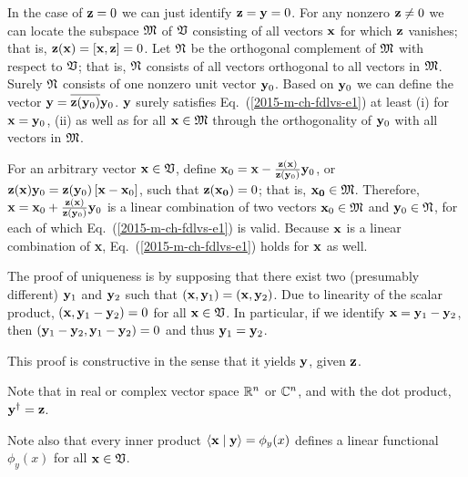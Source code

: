 {\color{OliveGreen}
\bproof
In the case of ${\bf z} =0$ we can just identify ${\bf z} ={\bf y}=0$.
For any nonzero ${\bf z} \neq 0$ we can locate the subspace ${\frak M}$ of ${\frak V}$ consisting of all vectors ${\bf x}$ for which ${\bf z}$ vanishes;
that is, ${\bf z}({\bf x})=[{\bf x},{\bf z}]=0$.
Let  ${\frak N}$ be the orthogonal complement of   ${\frak M}$ with respect to ${\frak V}$; that is,  ${\frak N}$ consists of all vectors orthogonal
to all vectors in  ${\frak M}$.
Surely ${\frak N}$ consists of one nonzero unit vector ${\bf y}_0$.
Based on ${\bf y}_0$ we can define the vector ${\bf y} = \overline{{\bf z}({\bf y}_0)} {\bf y}_0$.
${\bf y}$ surely satisfies Eq.~(\ref{2015-m-ch-fdlvs-e1}) at least
(i)
for ${\bf x} = {\bf y}_0$,
(ii)
as well as for all ${\bf x} \in {\frak M}$
through the orthogonality of ${\bf y}_0$ with all vectors in ${\frak M}$.

For an arbitrary vector ${\bf x} \in {\frak V}$, define
${\bf x}_0 =  {\bf x} -  \frac{{\bf z}({\bf x})}{{\bf z}({\bf y}_0)}  {\bf y}_0$, or
$ {\bf z}({\bf x})  {\bf y}_0 = {\bf z}({\bf y}_0) \left[{\bf x} - {\bf x}_0\right]$,
such that ${\bf z} ({\bf x_0})=0$; that is, ${\bf x_0} \in {\frak M}$.
Therefore,
${\bf x} =  {\bf x}_0 +  \frac{{\bf z}({\bf x})}{{\bf z}({\bf y}_0)}  {\bf y}_0$
is a linear combination of two vectors ${\bf x}_0 \in {\frak M}$ and ${\bf y}_0 \in {\frak N}$,
for each of which Eq.~(\ref{2015-m-ch-fdlvs-e1}) is valid.
Because ${\bf x}$ is a linear combination
of {\bf x}, Eq.~(\ref{2015-m-ch-fdlvs-e1}) holds for ${\bf x}$ as well.

The proof of uniqueness is by supposing
that there exist two (presumably different) ${\bf y}_1$ and ${\bf y}_2$
such that
$
({\bf x},{\bf y}_1)
=
({\bf x},{\bf y}_2)
$.
Due to linearity of the scalar product,
$
({\bf x},{\bf y}_1-{\bf y}_2) =0
$ for all ${\bf x} \in {\frak V}$.
In particular, if we identify
${\bf x}={\bf y}_1-{\bf y}_2$,
then
$
({\bf y}_1-{\bf y}_2,{\bf y}_1-{\bf y}_2) =0
$
and thus ${\bf y}_1={\bf y}_2$.

This proof is constructive in the sense that it yields ${\bf y}$, given ${\bf z}$.
\eproof
}



Note that in  real or complex vector space ${\Bbb R}^n$ or ${\Bbb C}^n$, and with the dot product,
 ${\bf y}^\dagger = {\bf z}$.

Note also that every inner product
$\langle {\bf x}\mid {\bf y}\rangle = \phi_y(x)$ defines a linear
functional $\phi_y(x)$ for all ${\bf x}\in {\frak V}$.




